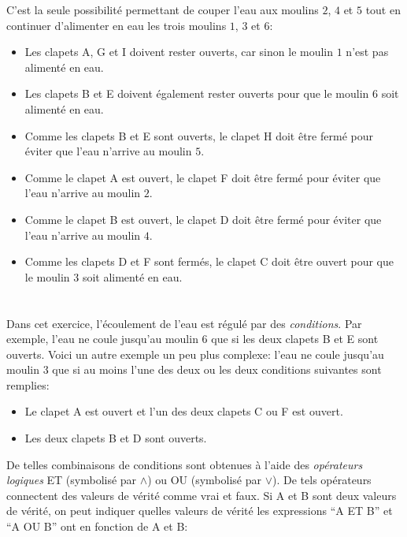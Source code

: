 {{C’est la seule possibilité permettant de couper l’eau aux moulins $2$, $4$ et $5$ tout en continuer d’alimenter en eau les trois moulins $1$, $3$ et $6$:

\begin{itemize}
  \item Les clapets A, G et I doivent rester ouverts, car sinon le moulin $1$ n’est pas alimenté en eau.
  \item Les clapets B et E doivent également rester ouverts pour que le moulin $6$ soit alimenté en eau.
  \item Comme les clapets B et E sont ouverts, le clapet H doit être fermé pour éviter que l’eau n’arrive au moulin $5$.
  \item Comme le clapet A est ouvert, le clapet F doit être fermé pour éviter que l’eau n’arrive au moulin $2$.
  \item Comme le clapet B est ouvert, le clapet D doit être fermé pour éviter que l’eau n’arrive au moulin $4$.
  \item Comme les clapets D et F sont fermés, le clapet C doit être ouvert pour que le moulin $3$ soit alimenté en eau.
\end{itemize}



\section*{\BrochureItsInformatics}
Dans cet exercice, l’écoulement de l’eau est régulé par des \emph{conditions}. Par exemple, l’eau ne coule jusqu’au moulin $6$ que si les deux clapets B et E sont ouverts. Voici un autre exemple un peu plus complexe: l’eau ne coule jusqu’au moulin $3$ que si au moins l’une des deux ou les deux conditions suivantes sont remplies:

\begin{itemize}
  \item Le clapet A est ouvert et l’un des deux clapets C ou F est ouvert.
  \item Les deux clapets B et D sont ouverts.
\end{itemize}

De telles combinaisons de conditions sont obtenues à l’aide des \emph{opérateurs logiques} ET (symbolisé par ${\wedge}$) ou OU (symbolisé par ${\vee}$). De tels opérateurs connectent des valeurs de vérité comme vrai et faux. Si A et B sont deux valeurs de vérité, on peut indiquer quelles valeurs de vérité les expressions “A ET B” et “A OU B” ont en fonction de A et B:

}}
